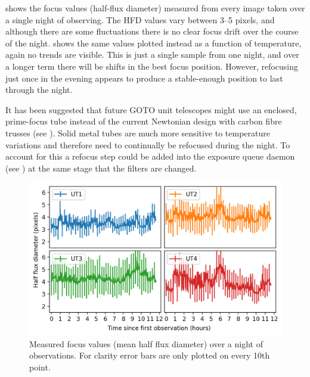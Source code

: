 \begin{colsection}
 shows the focus values (half-flux diameter) measured from every image taken over a single night of observing. The HFD values vary between 3--5 pixels, and although there are some fluctuations there is no clear focus drift over the course of the night.  shows the same values plotted instead as a function of temperature, again no trends are visible. This is just a single sample from one night, and over a longer term there will be shifts in the best focus position. However, refocusing just once in the evening appears to produce a stable-enough position to last through the night.

It has been suggested that future GOTO unit telescopes might use an enclosed, prime-focus tube instead of the current Newtonian design with carbon fibre trusses (see ). Solid metal tubes are much more sensitive to temperature variations and therefore need to continually be refocused during the night. To account for this a refocus step could be added into the exposure queue daemon (see ) at the same stage that the filters are changed.

\begin{figure}[p]
    \begin{center}
        \includegraphics[width=0.95\linewidth]{images/focus.png}
    \end{center}
    \caption[Measured focus values over a night of observations]{
        Measured focus values (mean half flux diameter) over a night of observations. For clarity error bars are only plotted on every 10th point.
    }\label{fig:focus_time}
\end{figure}


\end{colsection}
